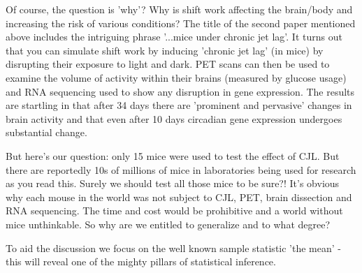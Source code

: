 \documentclass[a4paper,twosided,notoc]{tufte-book}
\begin{document}
Of course, the question is 'why'? Why is shift work affecting the brain/body and increasing the risk of various conditions? The title of the second paper mentioned above includes the intriguing phrase '...mice under chronic jet lag'. It turns out that you can simulate shift work by inducing 'chronic jet lag' (in mice) by disrupting their exposure to light and dark. PET scans can then be used to examine the volume of activity within their brains (measured by glucose usage) and RNA sequencing used to show any disruption in gene expression. The results are startling in that after 34 days there are 'prominent and pervasive' changes in brain activity and that even after 10 days circadian gene expression  undergoes substantial change. 

But here's our question: only 15 mice were used to test the effect of CJL. But there are reportedly 10s of millions  of mice in laboratories being used for research as you read this. Surely we should test all those mice to be sure?! It's obvious why each mouse in the world was not subject to CJL, PET, brain dissection and RNA sequencing. The time and cost would be prohibitive and a world without mice unthinkable. So why are we entitled to generalize and to what degree?

To aid the discussion we focus on the well known sample statistic 'the mean' - this will reveal one of the mighty pillars of statistical inference.
\end{document}
